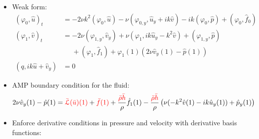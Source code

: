 \documentclass[
paperwidth=48in,paperheight=36in,
fontscale=0.4
]{baposter}
\begin{document}
\begin{poster}
{\begin{itemize}
    \item Weak form:
          \begin{align*}
              (\varphi_0, \hat{u})_t
              &=
              -2 \nu k^2 (\varphi_0, \hat{u})
              - \nu (\varphi_{0,y}, \hat{u}_y + i k \hat{v})
              - i k (\varphi_0, \hat{p})
              + (\varphi_0, \hat{f}_0)                                        \\
              (\varphi_1, \hat{v})_t
              &=
              -2 \nu (\varphi_{1,y}, \hat{v}_y)
              + \nu (\varphi_1, i k \hat{u}_y - k^2 \hat{v})
              + (\varphi_{1,y}, \hat{p})                                      \\
              &\phantom{=} + (\varphi_1, \hat{f}_1)
              + \varphi_1(1) (2 \nu \hat{v}_y(1) - \hat{p}(1))
              \nonumber                                                       \\
              (q, i k \hat{u} + \hat{v}_y)
              &= 0
          \end{align*}

    \item AMP boundary condition for the fluid:
          \begin{equation*}
              2 \nu \hat{v}_y(1) - \hat{p}(1)
              =
              {\color{red} \bar{\mathcal{L}}(\bar{u})}{\color{red}(1)}
              +
              {\color{red} \bar{f}}{\color{red}(1)}
              +
              \dfrac{{\color{red} \bar{\rho}}{\color{red} \bar{h}}}{\rho}
              \hat{f}_1(1)
              -
              \dfrac{{\color{red} \bar{\rho}}{\color{red} \bar{h}}}{\rho}
              \left(\nu (-k^2 \hat{v}(1) - i k \hat{u}_y(1)) + \hat{p}_y(1)\right)
          \end{equation*}

    \item Enforce derivative conditions in pressure and velocity with derivative
          basis functions:
\end{itemize}
\begin{center}




\end{center}}
\end{poster}
\end{document}
